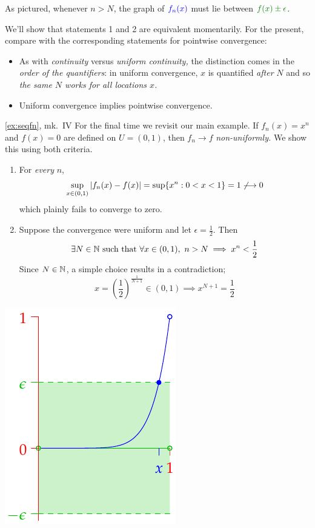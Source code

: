 As pictured, whenever $n>N$, the graph of $\textcolor{blue}{f_n(x)}$ must lie between $\textcolor{Green}{f(x)\pm\epsilon}$.\smallbreak

We'll show that statements 1 and 2 are equivalent momentarily. For the present, compare with the corresponding statements for pointwise convergence:
\begin{itemize}\itemsep0pt
  \item As with \emph{continuity} versus \emph{uniform continuity,} the distinction comes in the \emph{order of the quantifiers}: in uniform convergence, $x$ is quantified \emph{after} $N$ and so \emph{the same $N$ works for all locations $x$.}
  \item Uniform convergence implies pointwise convergence.
\end{itemize}


\begin{example*}{\ref{ex:seqfn}, mk.\ IV}{}
	For the final time we revisit our main example. If $f_n(x)=x^n$ and $f(x)=0$ are defined on $U=(0,1)$, then $f_n\to f$ \emph{non-uniformly.} We show this using both criteria.\medbreak
	\begin{minipage}{0.68\linewidth}\vspace{0pt}
		\begin{enumerate}
		  \item For \emph{every} $n$,
		  \[
		  	\sup_{x\in(0,1)}\left| f_n(x)-f(x)\right| =\sup\{x^n:0<x<1\}=1 \not\longrightarrow 0
		  \]
		  which plainly fails to converge to zero.
		  \item Suppose the convergence were uniform and let
		  $\epsilon=\frac 12$. Then 
		  \[
		  	\exists N\in\mathbb{N}\text{ such that }\forall x\in (0,1),\ n>N\implies x^n<\frac 12
		  \]
		  Since $N\in\mathbb{N}$, a simple choice results in a contradiction;
		  \[
		  	x=\left(\frac 12\right)^{\frac 1{N+1}}\in(0,1)\implies x^{N+1}=\frac 12
		 	\]
		\end{enumerate} 
  \end{minipage}
  \hfill
  \begin{minipage}{0.31\linewidth}\vspace{0pt}
		\flushright\includegraphics[scale=0.95]{unifconv2}
  \end{minipage}
\end{example*}


